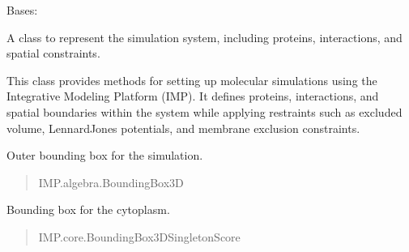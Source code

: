 \documentclass[letterpaper,10pt,english]{sphinxmanual}
\begin{document}
\begin{fulllineitems}
\label{\detokenize{src:src.System_Class.System}}
\pysigstartsignatures
{}
\pysigstopsignatures
\sphinxAtStartPar
Bases: 

\sphinxAtStartPar
A class to represent the simulation system, including proteins, interactions, and spatial constraints.

\sphinxAtStartPar
This class provides methods for setting up molecular simulations using the Integrative Modeling Platform (IMP).
It defines proteins, interactions, and spatial boundaries within the system while applying restraints
such as excluded volume, Lennard\sphinxhyphen{}Jones potentials, and membrane exclusion constraints.

\begin{fulllineitems}
\label{\detokenize{src:src.System_Class.System.bb}}
\pysigstartsignatures
{}
\pysigstopsignatures
\sphinxAtStartPar
Outer bounding box for the simulation.
\begin{quote}\begin{description}
\sphinxAtStartPar
IMP.algebra.BoundingBox3D

\end{description}\end{quote}

\end{fulllineitems}


\begin{fulllineitems}
\label{\detokenize{src:src.System_Class.System.bb_cyt_bbss}}
\pysigstartsignatures
{}
\pysigstopsignatures
\sphinxAtStartPar
Bounding box for the cytoplasm.
\begin{quote}\begin{description}
\sphinxAtStartPar
IMP.core.BoundingBox3DSingletonScore

\end{description}\end{quote}


\end{fulllineitems}
\end{fulllineitems}
\end{document}
